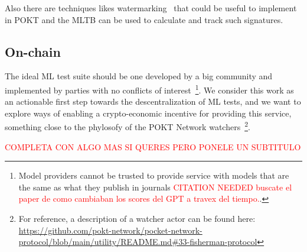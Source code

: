 Also there are techniques likes watermarking~\cite{kirchenbauer2023watermark} that could be useful to implement in POKT and the \gls{MLTB} can be used to calculate and track such signatures.

\subsection*{On-chain}

The ideal \gls{ML} test suite should be one developed by a big community and implemented by parties with no conflicts of interest~\footnote{Model providers cannot be trusted to provide service with models that are the same as what they publish in journals \textcolor{red}{CITATION NEEDED buscate el paper de como cambiaban los scores del GPT a travex del tiempo.}.}. We consider this work as an actionable first step towards the descentralization of \gls{ML} tests, and we want to explore ways of enabling a crypto-economic incentive for providing this service, something close to the phylosofy of the POKT Network watchers~\footnote{For reference, a description of a watcher actor can be found here: \url{https://github.com/pokt-network/pocket-network-protocol/blob/main/utility/README.md\#33-fisherman-protocol}}.





\textcolor{red}{COMPLETA CON ALGO MAS SI QUERES PERO PONELE UN SUBTITULO}
